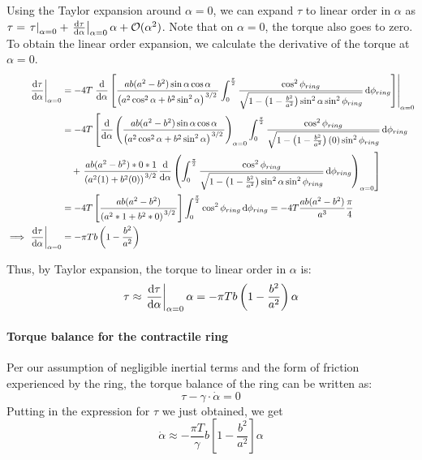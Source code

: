 Using the Taylor expansion around $\alpha = 0$, we can expand $\tau$ to linear order in $\alpha$ as $\tau = \left.\tau\right|_{\alpha=0} + \left.\dv{\tau}{\alpha}\right|_{\alpha=0}\alpha + \mathcal{O}(\alpha^2)$. Note that on $\alpha = 0$, the torque also goes to zero. To obtain the linear order expansion, we calculate the derivative of the torque at $\alpha = 0$.
\begin{align*}
    \left.\dv{\tau}{\alpha}\right|_{\alpha=0} &= -4T\left.\dv{\alpha}\left[\frac{ab(a^2 - b^2)\sin\alpha\cos\alpha}{\left(a^2\cos^2\alpha + b^2\sin^2\alpha\right)^{\flatfrac{3}{2}}}\int_0^{\frac{\pi}{2}}\frac{\cos^2\phi_{ring}}{\sqrt{1 - \left(1 - \frac{b^2}{a^2}\right)\sin^2\alpha\sin^2\phi_{ring}}}\dd{\phi_{ring}}\right]\right|_{\alpha = 0} \\
    &= -4T \left[\dv{\alpha}\left(\frac{ab(a^2 - b^2)\sin\alpha\cos\alpha}{\left(a^2\cos^2\alpha + b^2\sin^2\alpha\right)^{\flatfrac{3}{2}}}\right)_{\alpha=0}\int_0^{\frac{\pi}{2}}\frac{\cos^2\phi_{ring}}{\sqrt{1 - \left(1 - \frac{b^2}{a^2}\right)(0)\sin^2\phi_{ring}}}\dd{\phi_{ring}}\right.\\
    &\quad + \left.\frac{ab(a^2 - b^2)*0*1}{\left(a^2(1) + b^2(0)\right)^{\flatfrac{3}{2}}}\dv{\alpha}\left(\int_0^{\frac{\pi}{2}}\frac{\cos^2\phi_{ring}}{\sqrt{1 - \left(1 - \frac{b^2}{a^2}\right)\sin^2\alpha\sin^2\phi_{ring}}}\dd{\phi_{ring}}\right)_{\alpha=0}\right]\\
    &= -4T \left[\frac{ab(a^2 - b^2)}{\left(a^2*1 + b^2*0\right)^{\flatfrac{3}{2}}}\right] \int_0^{\frac{\pi}{2}}\cos^2\phi_{ring}\dd{\phi_{ring}} = -4T\frac{ab(a^2-b^2)}{a^3}\frac{\pi}{4}\\
    \implies \left.\dv{\tau}{\alpha}\right|_{\alpha=0} &= -\pi T b\left(1 - \frac{b^2}{a^2}\right)
\end{align*}

Thus, by Taylor expansion, the torque to linear order in $\alpha$ is:
\begin{equation} \label{eq:torque}
    \tau \approx \left.\dv{\tau}{\alpha}\right|_{\alpha=0}\alpha =  -\pi T b\left(1 - \frac{b^2}{a^2}\right)\alpha
\end{equation}

\paragraph{Torque balance for the contractile ring}
Per our assumption of negligible inertial terms and the form of friction experienced by the ring, the torque balance of the ring can be written as:
\begin{equation*}
    \tau - \gamma\cdot\dot{\alpha} = 0
\end{equation*}
Putting in the expression for $\tau$ we just obtained, we get
\begin{equation} \label{eq:alphaDot}
    \dot{\alpha} \approx - \frac{\pi T}{\gamma} b\left[1 - \frac{b^2}{a^2}\right]\alpha
\end{equation}


